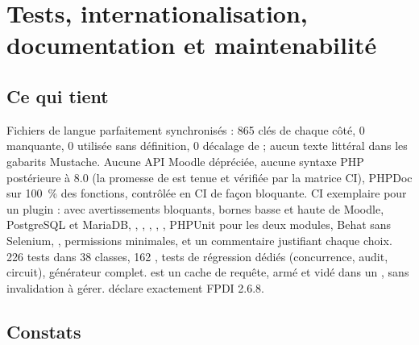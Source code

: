 \documentclass[11pt,a4paper]{article}
\begin{document}
\section{Tests, internationalisation, documentation et maintenabilité}

\subsection{Ce qui tient}

Fichiers de langue parfaitement synchronisés : 865 clés de chaque côté, 0 manquante, 0 utilisée
sans définition, 0 décalage de  ; aucun texte littéral dans les gabarits Mustache.
Aucune API Moodle dépréciée, aucune syntaxe PHP postérieure à 8.0 (la promesse de
 est tenue et vérifiée par la matrice CI), PHPDoc sur 100~\% des fonctions,
contrôlée en CI de façon bloquante. CI exemplaire pour un plugin :  avec
avertissements bloquants, bornes basse et haute de Moodle, PostgreSQL et MariaDB, ,
, , , , PHPUnit pour les deux
modules, Behat sans Selenium, , permissions minimales, et un
commentaire justifiant chaque choix. 226 tests dans 38 classes, 162 , tests de
régression dédiés (concurrence, audit, circuit), générateur complet.  est un
cache de requête, armé et vidé dans un , sans invalidation à gérer.
 déclare exactement FPDI 2.6.8.

\subsection{Constats}
\end{document}
